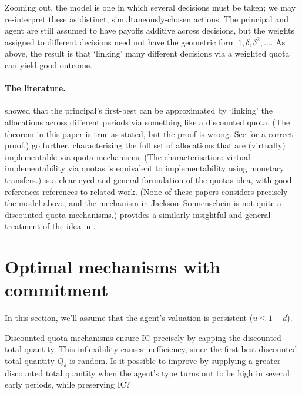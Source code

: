 \begin{remark}
	\label{remark:het}
	Zooming out, the model is one in which several decisions must be taken;
	we may re-interpret these as distinct, simultaneously-chosen actions.
	The principal and agent are still assumed to have payoffs additive across decisions, but the weights assigned to different decisions need not have the geometric form $1, \delta, \delta^2, \dots$.
	As above, the result is that `linking' many different decisions via a weighted quota can yield good outcome.
\end{remark}


\paragraph{The literature.}
\textcite{JacksonSonnenschein2007} showed that the principal's first-best can be approximated by `linking' the allocations across different periods via something like a discounted quota.
(The theorem in this paper is true as stated, but the proof is wrong. See \textcite{BallJacksonKattwinkel2022} for a correct proof.)
\textcite{MatsushimaMiyazakiYagi2010,Ishii2016} go further, characterising the full set of allocations that are (virtually) implementable via quota mechanisms.
(The characterisation: virtual implementability via quotas is equivalent to implementability using monetary transfers.)
\textcite{Frankel2016jet} is a clear-eyed and general formulation of the quotas idea, with good references references to related work.
(None of these papers considers precisely the model above,
and the mechanism in Jackson--Sonnenschein is not quite a discounted-quota mechanisms.)
\textcite{Frankel2016aej} provides a similarly insightful and general treatment of the idea in .



\section{Optimal mechanisms with commitment}
\label{sec:ch3:guohorner}

In this section, we'll assume that the agent's valuation is persistent ($u \leq 1-d$).

Discounted quota mechanisms ensure IC
precisely by capping the discounted total quantity.
This inflexibility causes inefficiency, since the first-best discounted total quantity $Q_\delta$ is random.
Is it possible to improve by supplying a greater discounted total quantity when the agent's type turns out to be high in several early periods, while preserving IC?

